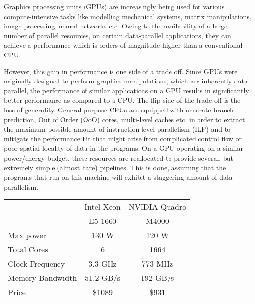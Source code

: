 
\label{sec:introduction}
\par{
	Graphics processing units (GPUs) are increasingly being used for various compute-intensive tasks like modelling mechanical systems, matrix manipulations, image processing, neural networks etc. Owing to the availability of a large number of parallel resources, on certain data-parallel applications, they can achieve a performance which is orders of magnitude higher than a conventional CPU.
}

\par{
	However, this gain in performance is one side of a trade off. Since GPUs were originally designed to perform graphics manipulations, which are inherently data parallel, the performance of similar applications on a GPU results in significantly better performance as compared to a CPU. The flip side of the trade off is the loss of generality. General purpose CPUs are equipped with accurate branch prediction, Out of Order (OoO) cores, multi-level caches etc. in order to extract the maximum possible amount of instruction level parallelism (ILP) and to mitigate the performance hit that might arise from complicated control flow or poor spatial locality of data in the programs. On a GPU operating on a similar power/energy budget, these resources are reallocated to provide several, but extremely simple (almost bare) pipelines. This is done, assuming that the programs that run on this machine will exhibit a staggering amount of data parallelism.
}

\begin{center}
	\begin{tabular}{|l|c|c|}
	\hline
			&	Intel Xeon 		& NVIDIA Quadro \\
			&	E5-1660			& M4000 \\
	\hline
	Max power 	&	130 W			& 120 W \\
	Total Cores		&	6			& 1664 \\
	Clock Frequency &	3.3 GHz			& 773 MHz \\
	Memory Bandwidth&	51.2 GB/s		& 192 GB/s \\
	Price		&	\$1089			& \$931 \\
	\hline
	\end{tabular}
\end{center}


